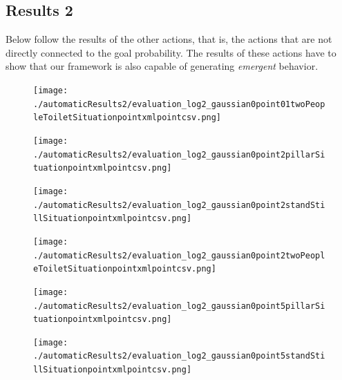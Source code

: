 \documentclass[11pt]{book}
\begin{document}
\subsection{Results 2}
Below follow the results of the other actions, that is, the actions that are not directly connected to the goal probability. The results of these actions have to show that our framework is also capable of generating \emph{emergent} behavior.


\begin{figure}
\centering
\texttt{[image: ./automaticResults2/evaluation\_log2\_gaussian0point01twoPeopleToiletSituationpointxmlpointcsv.png]}
\label{evaluation_log2_gaussian0point01twoPeopleToiletSituationpointxmlpointcsv}
\end{figure}

\begin{figure}
\centering
\texttt{[image: ./automaticResults2/evaluation\_log2\_gaussian0point2pillarSituationpointxmlpointcsv.png]}
\label{evaluation_log2_gaussian0point2pillarSituationpointxmlpointcsv}
\end{figure}

\begin{figure}
\centering
\texttt{[image: ./automaticResults2/evaluation\_log2\_gaussian0point2standStillSituationpointxmlpointcsv.png]}
\label{evaluation_log2_gaussian0point2standStillSituationpointxmlpointcsv}
\end{figure}

\begin{figure}
\centering
\texttt{[image: ./automaticResults2/evaluation\_log2\_gaussian0point2twoPeopleToiletSituationpointxmlpointcsv.png]}
\label{evaluation_log2_gaussian0point2twoPeopleToiletSituationpointxmlpointcsv}
\end{figure}

\begin{figure}
\centering
\texttt{[image: ./automaticResults2/evaluation\_log2\_gaussian0point5pillarSituationpointxmlpointcsv.png]}
\label{evaluation_log2_gaussian0point5pillarSituationpointxmlpointcsv}
\end{figure}

\begin{figure}
\centering
\texttt{[image: ./automaticResults2/evaluation\_log2\_gaussian0point5standStillSituationpointxmlpointcsv.png]}
\label{evaluation_log2_gaussian0point5standStillSituationpointxmlpointcsv}
\end{figure}
\end{document}

